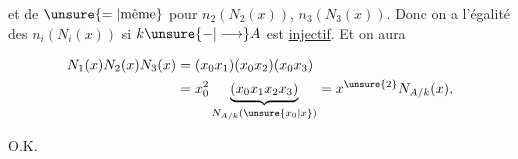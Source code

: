 et de $\unsure{=|\text{même}}$ pour $n_2(N_2(x))$, $n_3(N_3(x))$. Donc on a l'égalité des $n_i(N_i(x))$ si $k\unsure{\mathord{-}|\longrightarrow}A$ est \uline{injectif}. Et on aura

\[
 \begin{aligned}
 N_1(x)N_2(x)N_3(x)&=(x_0x_1)(x_0x_2)(x_0x_3)\\
 &=x_0^2\underbrace{(x_0x_1x_2x_3)}_{N_{A/k}(\unsure{x_0|x})}=x^{\unsure{2}}N_{A/k}(x),
 \end{aligned}
\]

O.K.


